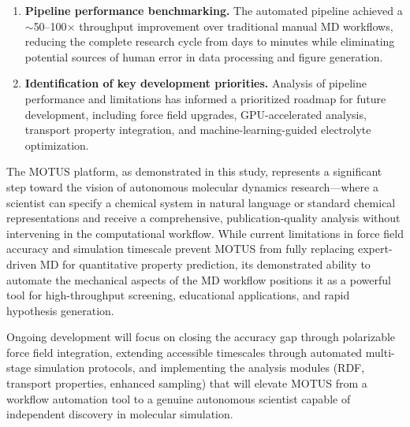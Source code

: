 \documentclass[twocolumn,10pt]{article}
\begin{document}
\begin{enumerate}[nosep, label=\textbf{\arabic*.}]
    \item \textbf{Pipeline performance benchmarking.} The automated pipeline achieved a $\sim$50--100$\times$ throughput improvement over traditional manual MD workflows, reducing the complete research cycle from days to minutes while eliminating potential sources of human error in data processing and figure generation.
    \item \textbf{Identification of key development priorities.} Analysis of pipeline performance and limitations has informed a prioritized roadmap for future development, including force field upgrades, GPU-accelerated analysis, transport property integration, and machine-learning-guided electrolyte optimization.
\end{enumerate}

The MOTUS platform, as demonstrated in this study, represents a significant step toward the vision of autonomous molecular dynamics research---where a scientist can specify a chemical system in natural language or standard chemical representations and receive a comprehensive, publication-quality analysis without intervening in the computational workflow. While current limitations in force field accuracy and simulation timescale prevent MOTUS from fully replacing expert-driven MD for quantitative property prediction, its demonstrated ability to automate the mechanical aspects of the MD workflow positions it as a powerful tool for high-throughput screening, educational applications, and rapid hypothesis generation.

Ongoing development will focus on closing the accuracy gap through polarizable force field integration, extending accessible timescales through automated multi-stage simulation protocols, and implementing the analysis modules (RDF, transport properties, enhanced sampling) that will elevate MOTUS from a workflow automation tool to a genuine autonomous scientist capable of independent discovery in molecular simulation.
\end{document}
